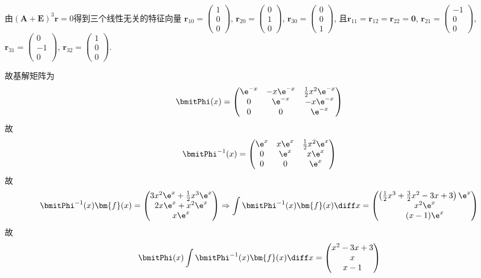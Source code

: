 \begin{solve}
由$(\bm{A}+\bm{E})^3\bm{r}=0$得到三个线性无关的特征向量
$\bm{r}_{10}=\begin{pmatrix}1\\0\\0\end{pmatrix}$,
$\bm{r}_{20}=\begin{pmatrix}0\\1\\0\end{pmatrix}$,
$\bm{r}_{30}=\begin{pmatrix}0\\0\\1\end{pmatrix}$, 
且$\bm{r}_{11}=\bm{r}_{12}=\bm{r}_{22}=\bm{0}$,
$\bm{r}_{21}=\begin{pmatrix}-1\\0\\0\end{pmatrix}$,
$\bm{r}_{31}=\begin{pmatrix}0\\-1\\0\end{pmatrix}$,
$\bm{r}_{32}=\begin{pmatrix}1\\0\\0\end{pmatrix}$.

故基解矩阵为
\[\bmitPhi(x)=\begin{pmatrix}\e^{-x}&-x\e^{-x}&\frac{1}{2}x^2\e^{-x}\\0&\e^{-x}&-x\e^{-x}\\0&0&\e^{-x}\end{pmatrix}\]
故\[\bmitPhi^{-1}(x)=\begin{pmatrix}\e^x&x\e^x&\frac{1}{2}x^2\e^x\\0&\e^x&x\e^x\\0&0&\e^x\end{pmatrix}\]
故\[\bmitPhi^{-1}(x)\bm{f}(x)=\begin{pmatrix}3x^2\e^x+\frac{1}{2}x^3\e^x\\2x\e^x+x^2\e^x\\x\e^x\end{pmatrix}\Rightarrow\int\bmitPhi^{-1}(x)\bm{f}(x)\diff x=\begin{pmatrix}\left(\frac{1}{2}x^3+\frac{3}{2}x^2-3x+3\right)\e^x\\x^2\e^x\\(x-1)\e^x\end{pmatrix}\]
故\[\bmitPhi(x)\int\bmitPhi^{-1}(x)\bm{f}(x)\diff x=\begin{pmatrix}x^2-3x+3\\x\\x-1\end{pmatrix}\]


\end{solve}
